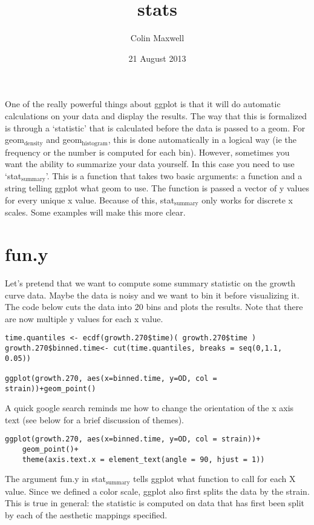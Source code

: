 \documentclass[11pt]{article}
\title{stats}
\author{Colin Maxwell}
\date{21 August 2013}
\begin{document}
\maketitle

\setcounter{tocdepth}{3}
\tableofcontents
\vspace*{1cm}
One of the really powerful things about ggplot is that it will do
automatic calculations on your data and display the results. The way
that this is formalized is through a `statistic' that is calculated
before the data is passed to a geom. For geom$_{\mathrm{density}}$ and
geom$_{\mathrm{histogram}}$, this is done automatically in a logical way (ie the
frequency or the number is computed for each bin). However,
sometimes you want the ability to summarize your data yourself. In
this case you need to use `stat$_{\mathrm{summary}}$'. This is a function that
takes two basic arguments: a function and a string telling ggplot what
geom to use. The function is passed a vector of y values for every
unique x value. Because of this, stat$_{\mathrm{summary}}$ only works for discrete
x scales. Some examples will make this more clear.

\section{fun.y}
\label{sec-1}

Let's pretend that we want to compute some summary statistic on the
growth curve data. Maybe the data is noisy and we want to bin it
before visualizing it. The code below cuts the data into 20 bins and
plots the results. Note that there are now multiple y values for each
x value.

\begin{verbatim}
time.quantiles <- ecdf(growth.270$time)( growth.270$time )
growth.270$binned.time<- cut(time.quantiles, breaks = seq(0,1.1, 0.05))

ggplot(growth.270, aes(x=binned.time, y=OD, col = strain))+geom_point()
\end{verbatim}


A quick google search reminds me how to change the orientation of the
x axis text (see below for a brief discussion of themes).

\begin{verbatim}
ggplot(growth.270, aes(x=binned.time, y=OD, col = strain))+
    geom_point()+
    theme(axis.text.x = element_text(angle = 90, hjust = 1))
\end{verbatim}


The argument fun.y in stat$_{\mathrm{summary}}$ tells ggplot what function to call
for each X value. Since we defined a color scale, ggplot also first
splits the data by the strain. This is true in general: the statistic
is computed on data that has first been split by each of the aesthetic
mappings specified.
\end{document}
